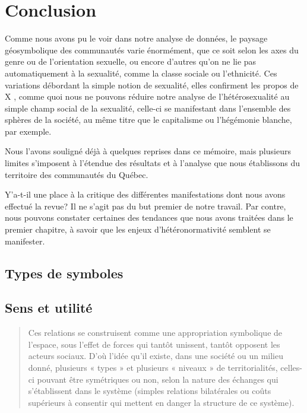 \chapter*{Conclusion}         %


Comme nous avons pu le voir dans notre analyse de données, le paysage géosymbolique des communautés \lgbt{} varie énormément, que ce soit selon les axes du genre ou de l'orientation sexuelle, ou encore d'autres qu'on ne lie pas automatiquement à la sexualité, comme la classe sociale ou l'ethnicité.
Ces variations débordant la simple notion de sexualité, elles confirment les propos de X , comme quoi nous ne pouvons réduire notre analyse de l'hétérosexualité au simple champ social de la sexualité, celle-ci se manifestant dans l'ensemble des sphères de la société, au même titre que le capitalisme ou l'hégémonie blanche, par exemple.


Nous l'avons souligné déjà à quelques reprises dans ce mémoire, mais plusieurs limites s'imposent à l'étendue des résultats et à l'analyse que nous établissons du territoire des communautés \lgbt{} du Québec.

Y'a-t-il une place à la critique des différentes manifestations dont nous avons effectué la revue?
Il ne s'agit pas du but premier de notre travail.
Par contre, nous pouvons constater certaines des tendances que nous avons traitées dans le premier chapitre, à savoir que les enjeux d'hétéronormativité semblent se manifester.

\section{Types de symboles}
\label{sec:types_de_symboles}


\section{Sens et utilité}
\label{sec:sens_et_utilit_}
\begin{quotation}
Ces relations se construisent comme une appropriation symbolique de l'espace, sous l'effet de forces qui tantôt unissent, tantôt opposent les acteurs sociaux. 
D'où l'idée qu'il existe, dans une société ou un milieu donné, plusieurs « types » et plusieurs « niveaux » de territorialités, celles-ci pouvant être symétriques ou non, selon la nature des échanges qui s'établissent dans le système (simples relations bilatérales ou coûts supérieurs à consentir qui mettent en danger la structure de ce système).\citep[41]{Courville1991}
\end{quotation}

